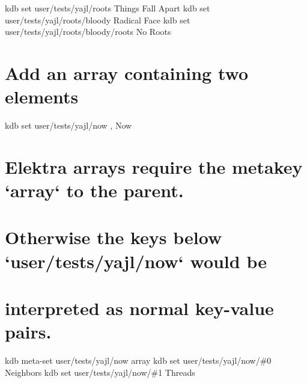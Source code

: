 kdb set user/tests/yajl/roots \textquotesingle{}Things Fall Apart\textquotesingle{} kdb set user/tests/yajl/roots/bloody \textquotesingle{}Radical Face\textquotesingle{} kdb set user/tests/yajl/roots/bloody/roots \textquotesingle{}No Roots\textquotesingle{}\hypertarget{autotoc_md835_autotoc_md855}{}\section{Add an array containing two elements}\label{autotoc_md835_autotoc_md855}
kdb set user/tests/yajl/now \textquotesingle{}, Now\textquotesingle{} \hypertarget{autotoc_md835_autotoc_md856}{}\section{Elektra arrays require the metakey `array` to the parent.}\label{autotoc_md835_autotoc_md856}
\hypertarget{autotoc_md835_autotoc_md857}{}\section{Otherwise the keys below `user/tests/yajl/now` would be}\label{autotoc_md835_autotoc_md857}
\hypertarget{autotoc_md835_autotoc_md858}{}\section{interpreted as normal key-\/value pairs.}\label{autotoc_md835_autotoc_md858}
kdb meta-\/set user/tests/yajl/now array \textquotesingle{}\textquotesingle{} kdb set user/tests/yajl/now/\#0 \textquotesingle{}Neighbors\textquotesingle{} kdb set user/tests/yajl/now/\#1 \textquotesingle{}Threads\textquotesingle{}

